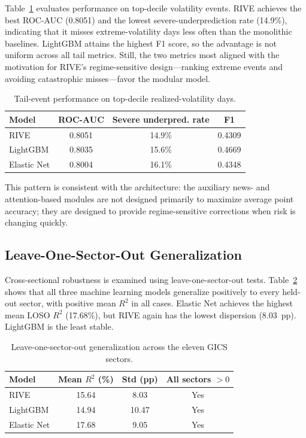 \documentclass[review]{elsarticle}
\begin{document}
Table~\ref{tab:tail-metrics} evaluates performance on top-decile volatility events. RIVE achieves the best ROC-AUC (0.8051) and the lowest severe-underprediction rate (14.9\%), indicating that it misses extreme-volatility days less often than the monolithic baselines. LightGBM attains the highest F1 score, so the advantage is not uniform across all tail metrics. Still, the two metrics most aligned with the motivation for RIVE's regime-sensitive design---ranking extreme events and avoiding catastrophic misses---favor the modular model.

\begin{table}[H]
\centering
\caption{Tail-event performance on top-decile realized-volatility days.}
\label{tab:tail-metrics}
\begin{tabular}{lccc}
\toprule
Model & ROC-AUC & Severe underpred. rate & F1 \\
\midrule
RIVE & 0.8051 & 14.9\% & 0.4309 \\
LightGBM & 0.8035 & 15.6\% & 0.4669 \\
Elastic Net & 0.8004 & 16.1\% & 0.4348 \\
\bottomrule
\end{tabular}
\end{table}

This pattern is consistent with the architecture: the auxiliary news- and attention-based modules are not designed primarily to maximize average point accuracy; they are designed to provide regime-sensitive corrections when risk is changing quickly.

\subsection{Leave-One-Sector-Out Generalization}\label{sec:loso}

Cross-sectional robustness is examined using leave-one-sector-out tests. Table~\ref{tab:loso} shows that all three machine learning models generalize positively to every held-out sector, with positive mean $R^2$ in all cases. Elastic Net achieves the highest mean LOSO $R^2$ (17.68\%), but RIVE again has the lowest dispersion (8.03~pp). LightGBM is the least stable.

\begin{table}[H]
\centering
\caption{Leave-one-sector-out generalization across the eleven GICS sectors.}
\label{tab:loso}
\begin{tabular}{lccc}
\toprule
Model & Mean $R^2$ (\%) & Std (pp) & All sectors $>0$ \\
\midrule
RIVE & 15.64 & 8.03 & Yes \\
LightGBM & 14.94 & 10.47 & Yes \\
Elastic Net & 17.68 & 9.05 & Yes \\
\bottomrule
\end{tabular}
\end{table}
\end{document}
